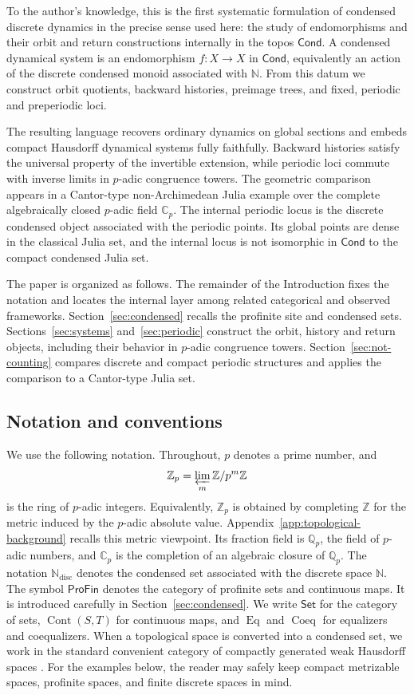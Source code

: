 \documentclass[10pt]{amsart}
\newcommand{\ProFin}{\mathsf{ProFin}}
\newcommand{\Set}{\mathsf{Set}}
\newcommand{\Cond}{\mathsf{Cond}}
\newcommand{\Eq}{\operatorname{Eq}}
\newcommand{\Coeq}{\operatorname{Coeq}}
\newcommand{\Cont}{\operatorname{Cont}}
\newcommand{\Z}{\mathbb{Z}}
\newcommand{\N}{\mathbb{N}}
\newcommand{\Ndisc}{\mathbb{N}_{\mathrm{disc}}}
\newcommand{\Zp}{\mathbb{Z}_p}
\newcommand{\Qp}{\mathbb{Q}_p}
\newcommand{\Cp}{\mathbb{C}_p}
\theoremstyle{plain}
\theoremstyle{definition}
\begin{document}
To the author's knowledge, this is the first systematic formulation of
condensed discrete dynamics in the precise sense used here: the study of
endomorphisms and their orbit and return constructions internally in the topos
\(\Cond\). A condensed dynamical system is an endomorphism \(f:X\to X\) in
\(\Cond\), equivalently an action of the discrete condensed monoid associated
with \(\mathbb N\).
From this datum we construct orbit quotients, backward histories, preimage
trees, and fixed, periodic and preperiodic loci.

The resulting language recovers ordinary dynamics on global sections and
embeds compact Hausdorff dynamical systems fully faithfully. Backward histories
satisfy the universal property of the invertible extension, while periodic loci
commute with inverse limits in \(p\)-adic congruence towers. The geometric
comparison appears in a Cantor-type non-Archimedean Julia example over the
complete algebraically closed \(p\)-adic field \(\Cp\). The internal periodic
locus is the discrete condensed object associated with the periodic points. Its
global points are dense in the classical Julia set, and the internal locus is
not isomorphic in \(\Cond\) to the compact condensed Julia set.

The paper is organized as follows. The remainder of the Introduction fixes the
notation and locates the internal layer among related categorical and observed
frameworks. Section~\ref{sec:condensed} recalls the profinite site and condensed
sets. Sections~\ref{sec:systems} and~\ref{sec:periodic} construct the orbit,
history and return objects, including their behavior in \(p\)-adic congruence
towers. Section~\ref{sec:not-counting} compares discrete and compact periodic
structures and applies the comparison to a Cantor-type Julia set.

\subsection{Notation and conventions}
\label{sec:notation}

We use the following notation. Throughout, $p$ denotes a prime
number, and
\[
  \Zp=\varprojlim_m \Z/p^m\Z
\]
is the ring of $p$-adic integers. Equivalently, $\Zp$ is obtained by completing
$\Z$ for the metric induced by the $p$-adic absolute value. Appendix~\ref{app:topological-background}
recalls this metric viewpoint. Its fraction field is $\Qp$, the field of
$p$-adic numbers, and $\Cp$ is the completion of an algebraic closure of $\Qp$.
The notation $\Ndisc$ denotes the condensed set associated with the discrete
space $\N$. The symbol $\ProFin$ denotes the category of profinite sets and
continuous maps. It is introduced carefully in Section~\ref{sec:condensed}. We
write $\Set$ for the category of sets, $\Cont(S,T)$ for continuous maps, and
$\Eq$ and $\Coeq$ for equalizers and coequalizers. When a topological space is
converted into a condensed set, we work in the standard convenient category of
compactly generated weak Hausdorff spaces \cite{ClausenScholze,LeStumCondensed}.
For the examples below, the reader may safely keep compact metrizable
spaces, profinite spaces, and finite discrete spaces in mind.
\end{document}
